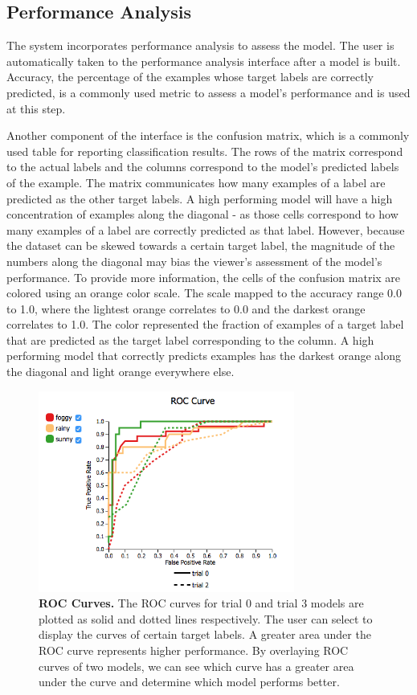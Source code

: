 \subsection{Performance Analysis} \label{PASection}
The system incorporates performance analysis to assess the model. The user is automatically taken to the performance analysis interface after a model is built. Accuracy, the percentage of the examples whose target labels are correctly predicted, is a commonly used metric to assess a model's performance and is used at this step. 

Another component of the interface is the confusion matrix, which is a commonly used table for reporting classification results. The rows of the matrix correspond to the actual labels and the columns correspond to the model's predicted labels of the example. The matrix communicates how many examples of a label are predicted as the other target labels. A high performing model will have a high concentration of examples along the diagonal - as those cells correspond to how many examples of a label are correctly predicted as that label. However, because the dataset can be skewed towards a certain target label, the magnitude of the numbers along the diagonal may bias the viewer's assessment of the model's performance. To provide more information, the cells of the confusion matrix are colored using an orange color scale. The scale mapped to the accuracy range 0.0 to 1.0, where the lightest orange correlates to 0.0 and the darkest orange correlates to 1.0. The color represented the fraction of examples of a target label that are predicted as the target label corresponding to the column. A high performing model that correctly predicts examples has the darkest orange along the diagonal and light orange everywhere else. 

\begin{figure}[!htbp]
\centering
\includegraphics[width=0.75\textwidth]{ROCmultiple}
\caption{\textbf{ROC Curves.} The ROC curves for trial 0 and trial 3 models are plotted as solid and dotted lines respectively. The user can select to display the curves of certain target labels. A greater area under the ROC curve represents higher performance. By overlaying ROC curves of two models, we can see which curve has a greater area under the curve and determine which model performs better.} \label{fig:ROCmultiple}
\end{figure}

